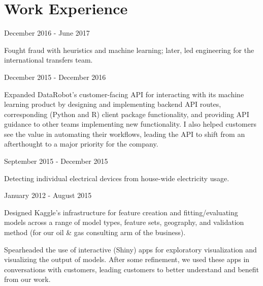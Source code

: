 \documentclass[letterpaper]{resume}
\author{David J. Chudzicki}
\begin{document}
\maketitle

\section{Work Experience}


{December 2016 - June 2017}


\begin{compactitem}
\item Fought fraud with heuristics and machine learning; later, led engineering for the international transfers team.
\end{compactitem}



{December 2015 - December 2016}


\begin{compactitem}
\item Expanded DataRobot's customer-facing API for interacting with its machine learning product by designing and implementing backend API routes, corresponding (Python and R) client package functionality, and providing API guidance to other teams implementing new functionality. I also helped customers see the value in automating their workflows, leading the API to shift from an afterthought to a major priority for the company.
\end{compactitem}


{September 2015 - December 2015}


\begin{compactitem}
\item Detecting individual electrical devices from house-wide electricity usage.
\end{compactitem}


{January 2012 - August 2015}            


\begin{compactitem}
\item Designed Kaggle's infrastructure for feature creation and fitting/evaluating models across a range of model types, feature sets, geography, and validation method (for our oil \& gas consulting arm of the business).
\item Spearheaded the use of interactive (Shiny) apps for exploratory visualization and visualizing the output of models. After some refinement, we used these apps in conversations with customers, leading customers to better understand and benefit from our work.
\end{compactitem}
\end{document}
